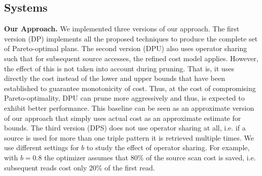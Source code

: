 








\subsection{Systems}
\textbf{Our Approach.} We implemented three versions of our
approach. The first version (DP) implements all the proposed
techniques to produce the complete set of Pareto-optimal plans. The
second version (DPU) also uses operator sharing such that for
subsequent source accesses, the refined cost model applies. However,
the effect of this is not taken into account during pruning.  That is,
it uses directly the cost instead of the lower and upper bounds that
have been established to guarantee monotonicity of cost. Thus, at the
cost of compromising Pareto-optimality, DPU can prune more
aggressively and thus, is expected to exhibit better performance. This baseline can be seen as an approximate version of our approach that simply uses actual cost as an approximate estimate for bounds. 
The third version (DPS) does not use
operator sharing at all, i.e. if a source is used for more than one
triple pattern it is retrieved multiple times. 
We use different settings for $b$ to study the effect of operator sharing. For example, with $b=0.8$ the optimizer assumes that 80\% of
the source scan cost is saved, i.e. subsequent reads cost only 20\% of the first read.

